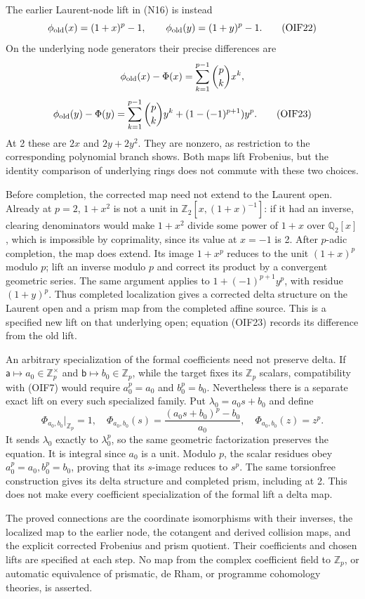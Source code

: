 \documentclass[
]{article}
\begin{document}
The earlier Laurent-node lift in (N16) is instead \[
\phi_{\rm old}(x)=(1+x)^p-1,\qquad
\phi_{\rm old}(y)=(1+y)^p-1.
\tag{OIF22}
\] On the underlying node generators their precise differences are \[
\phi_{\rm old}(x)-\Phi(x)
=\sum_{k=1}^{p-1}\binom pkx^k,
\] \[
\phi_{\rm old}(y)-\Phi(y)
=\sum_{k=1}^{p-1}\binom pky^k
+(1-(-1)^{p+1})y^p.
\tag{OIF23}
\] At 2 these are \(2x\) and \(2y+2y^2\). They are nonzero, as
restriction to the corresponding polynomial branch shows. Both maps lift
Frobenius, but the identity comparison of underlying rings does not
commute with these two choices.

Before completion, the corrected map need not extend to the Laurent
open. Already at \(p=2\), \(1+x^2\) is not a unit in
\(\mathbb Z_2[x,(1+x)^{-1}]\): if it had an inverse, clearing
denominators would make \(1+x^2\) divide some power of \(1+x\) over
\(\mathbb Q_2[x]\), which is impossible by coprimality, since its value
at \(x=-1\) is 2. After \(p\)-adic completion, the map does extend. Its
image \(1+x^p\) reduces to the unit \((1+x)^p\) modulo \(p\); lift an
inverse modulo \(p\) and correct its product by a convergent geometric
series. The same argument applies to \(1+(-1)^{p+1}y^p\), with residue
\((1+y)^p\). Thus completed localization gives a corrected delta
structure on the Laurent open and a prism map from the completed affine
source. This is a specified new lift on that underlying open; equation
(OIF23) records its difference from the old lift.

An arbitrary specialization of the formal coefficients need not preserve
delta. If \(\mathsf a\mapsto a_0\in\mathbb Z_p^\times\) and
\(\mathsf b\mapsto b_0\in\mathbb Z_p\), while the target fixes its
\(\mathbb Z_p\) scalars, compatibility with (OIF7) would require
\(a_0^p=a_0\) and \(b_0^p=b_0\). Nevertheless there is a separate exact
lift on every such specialized family. Put \(\lambda_0=a_0s+b_0\) and
define \[
\Phi_{a_0,b_0}|_{\mathbb Z_p}=1,\quad
\Phi_{a_0,b_0}(s)=\frac{(a_0s+b_0)^p-b_0}{a_0},\quad
\Phi_{a_0,b_0}(z)=z^p.
\tag{OIF24}
\] It sends \(\lambda_0\) exactly to \(\lambda_0^p\), so the same
geometric factorization preserves the equation. It is integral since
\(a_0\) is a unit. Modulo \(p\), the scalar residues obey
\(a_0^p=a_0,b_0^p=b_0\), proving that its \(s\)-image reduces to
\(s^p\). The same torsionfree construction gives its delta structure and
completed prism, including at 2. This does not make every coefficient
specialization of the formal lift a delta map.

The proved connections are the coordinate isomorphisms with their
inverses, the localized map to the earlier node, the cotangent and
derived collision maps, and the explicit corrected Frobenius and prism
quotient. Their coefficients and chosen lifts are specified at each
step. No map from the complex coefficient field to \(\mathbb Z_p\), or
automatic equivalence of prismatic, de Rham, or programme cohomology
theories, is asserted.
\end{document}
